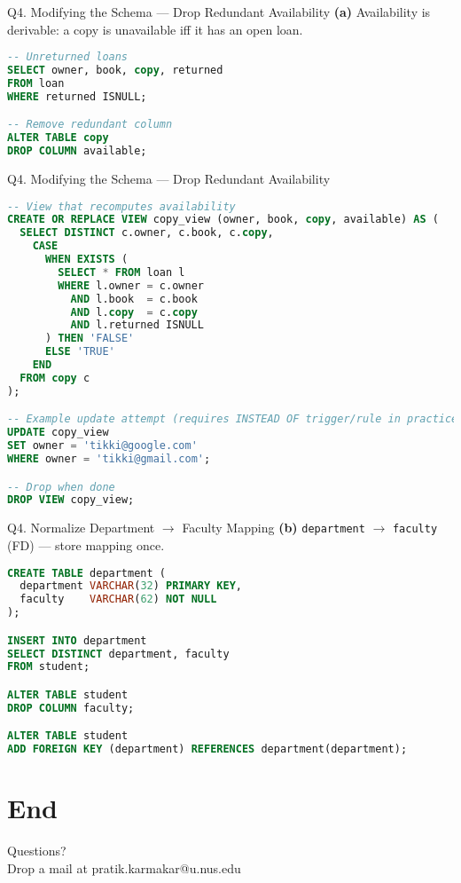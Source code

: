 \documentclass{beamer}
\begin{document}
\begin{frame}[fragile]{Q4. Modifying the Schema — Drop Redundant Availability}
\textbf{(a)} Availability is derivable: a copy is unavailable iff it has an open loan.
\begin{lstlisting}[language=SQL]
-- Unreturned loans
SELECT owner, book, copy, returned
FROM loan
WHERE returned ISNULL;

-- Remove redundant column
ALTER TABLE copy
DROP COLUMN available;
\end{lstlisting}
\end{frame}
\begin{frame}[fragile]{Q4. Modifying the Schema — Drop Redundant Availability}
\begin{lstlisting}[language=SQL]
-- View that recomputes availability
CREATE OR REPLACE VIEW copy_view (owner, book, copy, available) AS (
  SELECT DISTINCT c.owner, c.book, c.copy,
    CASE
      WHEN EXISTS (
        SELECT * FROM loan l
        WHERE l.owner = c.owner
          AND l.book  = c.book
          AND l.copy  = c.copy
          AND l.returned ISNULL
      ) THEN 'FALSE'
      ELSE 'TRUE'
    END
  FROM copy c
);

-- Example update attempt (requires INSTEAD OF trigger/rule in practice)
UPDATE copy_view
SET owner = 'tikki@google.com'
WHERE owner = 'tikki@gmail.com';

-- Drop when done
DROP VIEW copy_view;
\end{lstlisting}
\end{frame}

\begin{frame}[fragile]{Q4. Normalize Department \texorpdfstring{$\to$}{->} Faculty Mapping}
\textbf{(b)} \texttt{department} $\to$ \texttt{faculty} (FD) — store mapping once.
\begin{lstlisting}[language=SQL]
CREATE TABLE department (
  department VARCHAR(32) PRIMARY KEY,
  faculty    VARCHAR(62) NOT NULL
);

INSERT INTO department
SELECT DISTINCT department, faculty
FROM student;

ALTER TABLE student
DROP COLUMN faculty;

ALTER TABLE student
ADD FOREIGN KEY (department) REFERENCES department(department);
\end{lstlisting}
\end{frame}

\section*{End}
\begin{frame}
\begin{center}
Questions?\\
Drop a mail at pratik.karmakar@u.nus.edu
\end{center}
\end{frame}
\end{document}

